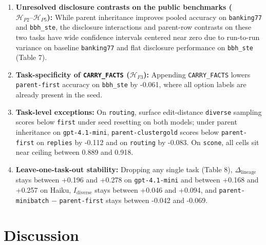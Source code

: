 \documentclass[10pt]{article}
\providecommand{\tightlist}{%
  \setlength{\itemsep}{0pt}\setlength{\parskip}{0pt}}
\begin{document}
\begin{enumerate}
\def\labelenumi{\arabic{enumi}.}
\tightlist
\item
  \textbf{Unresolved disclosure contrasts on the public benchmarks
  (\(\mathcal{H}_{P2}\text{--}\mathcal{H}_{P5}\)):} While parent
  inheritance improves pooled accuracy on \texttt{banking77} and
  \texttt{bbh\_ste}, the disclosure interactions and parent-row
  contrasts on these two tasks have wide confidence intervals centered
  near zero due to run-to-run variance on baseline \texttt{banking77}
  and flat disclosure performance on \texttt{bbh\_ste} (Table 7).
\item
  \textbf{Task-specificity of \texttt{CARRY\_FACTS}
  (\(\mathcal{H}_{F3}\)):} Appending \texttt{CARRY\_FACTS} lowers
  \texttt{parent-first} accuracy on \texttt{bbh\_ste} by -0.061, where
  all option labels are already present in the seed.
\item
  \textbf{Task-level exceptions:} On \texttt{routing}, surface
  edit-distance \texttt{diverse} sampling scores below \texttt{first}
  under seed resetting on both models; under parent inheritance on
  \texttt{gpt-4.1-mini}, \texttt{parent-clustergold} scores below
  \texttt{parent-first} on \texttt{replies} by -0.112 and on
  \texttt{routing} by -0.083. On \texttt{scone}, all cells sit near
  ceiling between 0.889 and 0.918.
\item
  \textbf{Leave-one-task-out stability:} Dropping any single task (Table
  8), \(\Delta_{\text{lineage}}\) stays between +0.196 and +0.278 on
  \texttt{gpt-4.1-mini} and between +0.168 and +0.257 on Haiku,
  \(I_{\text{diverse}}\) stays between +0.046 and +0.094, and
  \texttt{parent-minibatch} \(-\) \texttt{parent-first} stays between
  -0.042 and -0.069.
\end{enumerate}

\hypertarget{discussion}{%
\section{Discussion}\label{discussion}}
\end{document}
